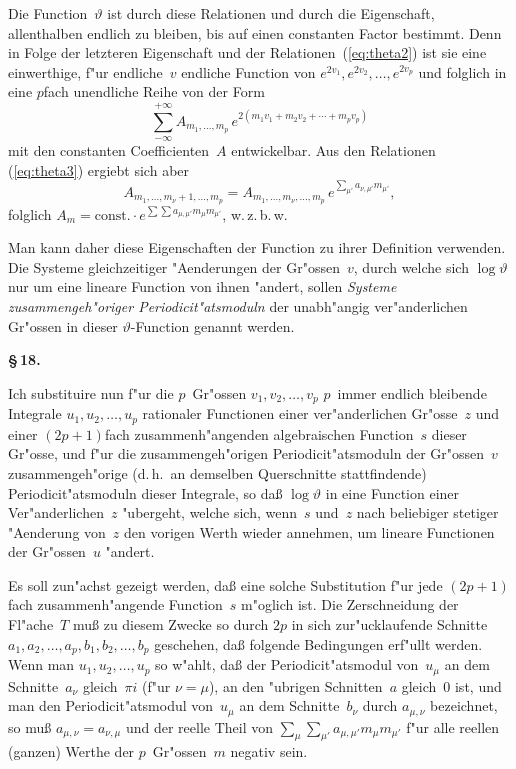 \documentclass[12pt,a4paper]{article}
\begin{document}
Die Function~$\vartheta$ ist durch diese Relationen und durch die Eigenschaft,
allenthalben endlich zu bleiben, bis auf einen constanten Factor bestimmt.
Denn in Folge der letzteren Eigenschaft und der Relationen~(\ref{eq:theta2})
ist sie eine einwerthige, f"ur endliche~$v$ endliche Function von
$e^{2v_1}, e^{2v_2}, \ldots, e^{2v_p}$ und folglich in eine $p$fach unendliche Reihe
von der Form
\[
\sum_{-\infty}^{+\infty} A_{m_1,\ldots,m_p}\,
  e^{2(m_1 v_1 + m_2 v_2 + \cdots + m_p v_p)}
\]
mit den constanten Coefficienten~$A$ entwickelbar. Aus den Relationen
(\ref{eq:theta3}) ergiebt sich aber
\[
A_{m_1,\ldots,m_\nu+1,\ldots,m_p} =
A_{m_1,\ldots,m_\nu,\ldots,m_p}\,
  e^{\sum_{\mu'} a_{\nu,\mu'} m_{\mu'}},
\]
folglich $A_m = \text{const.} \cdot e^{\sum \sum a_{\mu,\mu'} m_\mu m_{\mu'}}$, w.\,z.\,b.\,w.

Man kann daher diese Eigenschaften der Function zu ihrer Definition
verwenden. Die Systeme gleichzeitiger "Aenderungen der Gr"ossen~$v$,
durch welche sich $\log\vartheta$ nur um eine lineare Function von ihnen "andert,
sollen \emph{Systeme zusammengeh"origer Periodicit"atsmoduln} der unabh"angig
ver"anderlichen Gr"ossen in dieser $\vartheta$-Function genannt werden.

\medskip
\textbf{\S\,18.}

Ich substituire nun f"ur die $p$~Gr"ossen $v_1, v_2, \ldots, v_p$ $p$~immer
endlich bleibende Integrale $u_1, u_2, \ldots, u_p$ rationaler Functionen einer
ver"anderlichen Gr"osse~$z$ und einer $(2p+1)$fach zusammenh"angenden
algebraischen Function~$s$ dieser Gr"osse, und f"ur die zusammengeh"origen
Periodicit"atsmoduln der Gr"ossen~$v$ zusammengeh"orige (d.\,h.\ an demselben
Querschnitte stattfindende) Periodicit"atsmoduln dieser Integrale, so da\ss{}
$\log\vartheta$ in eine Function einer Ver"anderlichen~$z$ "ubergeht, welche sich,
wenn~$s$ und~$z$ nach beliebiger stetiger "Aenderung von~$z$ den vorigen
Werth wieder annehmen, um lineare Functionen der Gr"ossen~$u$ "andert.

Es soll zun"achst gezeigt werden, da\ss{} eine solche Substitution f"ur jede
$(2p+1)$fach zusammenh"angende Function~$s$ m"oglich ist. Die Zerschneidung
der Fl"ache~$T$ mu\ss{} zu diesem Zwecke so durch $2p$ in sich zur"ucklaufende
Schnitte $a_1, a_2, \ldots, a_p, b_1, b_2, \ldots, b_p$ geschehen, da\ss{} folgende
Bedingungen erf"ullt werden. Wenn man $u_1, u_2, \ldots, u_p$ so w"ahlt, da\ss{}
der Periodicit"atsmodul von~$u_\mu$ an dem Schnitte~$a_\nu$ gleich~$\pi i$ (f"ur
$\nu = \mu$), an den "ubrigen Schnitten~$a$ gleich~$0$ ist, und man den
Periodicit"atsmodul von~$u_\mu$ an dem Schnitte~$b_\nu$ durch $a_{\mu,\nu}$
bezeichnet, so mu\ss{} $a_{\mu,\nu} = a_{\nu,\mu}$ und der reelle Theil von
$\sum_\mu \sum_{\mu'} a_{\mu,\mu'} m_\mu m_{\mu'}$ f"ur alle reellen (ganzen) Werthe der
$p$~Gr"ossen~$m$ negativ sein.
\end{document}
